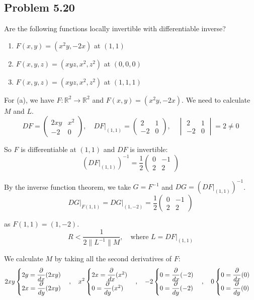 \documentclass[11pt]{article}
\begin{document}
\subsection*{Problem 5.20}
Are the following functions locally invertible with differentiable inverse?
\begin{enumerate}[label=(\alph*)]
    \item $F(x,y) = (x^2y, -2x)$ \quad at $(1,1)$
    \item $F(x,y,z) = (xyz, x^2, z^2)$ \quad at $(0,0,0)$
    \item $F(x,y,z) = (xyz, x^2, z^2)$ \quad at $(1,1,1)$
\end{enumerate}

For (a), we have $F : \mathbb{R}^2 \rightarrow \mathbb{R}^2$ and $F(x,y) = (x^2y, -2x)$. We need to calculate $M$ and $L$.
\[
DF = \begin{pmatrix}
    2xy & x^2 \\
    -2 & 0
\end{pmatrix}, \quad DF \big|_{(1,1)} = \begin{pmatrix}
    2 & 1 \\
    -2 & 0
\end{pmatrix}, \quad \begin{vmatrix}
    2 & 1 \\
    -2 & 0
\end{vmatrix} = 2 \neq 0
\]

So $F$ is differentiable at $(1,1)$ and $DF$ is invertible:
\[
\left(DF \big|_{(1,1)}\right)^{-1} = \frac{1}{2} \begin{pmatrix}
    0 & -1 \\
    2 & 2
\end{pmatrix}
\]

By the inverse function theorem, we take $G = F^{-1}$ and $DG = \left(DF \big|_{(1,1)}\right)^{-1}$.
\[
DG \big|_{F(1,1)} = DG \big|_{(1,-2)} = \frac{1}{2} \begin{pmatrix}
    0 & -1 \\
    2 & 2
\end{pmatrix}
\]

as $F(1,1) = (1,-2)$.
\[
R < \frac{1}{2 \|L^{-1}\| M}, \quad \text{where } L = DF \big|_{(1,1)}
\]

We calculate $M$ by taking all the second derivatives of $F$:
\[
2xy \space
\begin{cases}
    2y = \dfrac{\partial}{dx} (2xy) \\
    2x = \dfrac{\partial}{dy} (2xy)
\end{cases}, \quad
x^2 \space
\begin{cases}
    2x = \dfrac{\partial}{dx} (x^2) \\
    0 = \dfrac{\partial}{dy} (x^2)
\end{cases}, \quad
-2 \space
\begin{cases}
    0 = \dfrac{\partial}{dx} (-2) \\
    0 = \dfrac{\partial}{dy} (-2)
\end{cases}, \quad
0 \space
\begin{cases}
    0 = \dfrac{\partial}{dx} (0) \\
    0 = \dfrac{\partial}{dy} (0)
\end{cases}
\]
\end{document}
